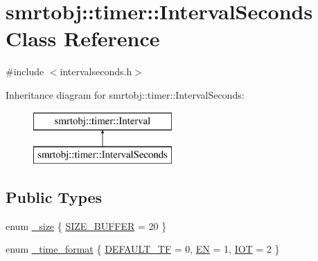\hypertarget{classsmrtobj_1_1timer_1_1_interval_seconds}{}\section{smrtobj\+:\+:timer\+:\+:Interval\+Seconds Class Reference}
\label{classsmrtobj_1_1timer_1_1_interval_seconds}


{\ttfamily \#include $<$intervalseconds.\+h$>$}

Inheritance diagram for smrtobj\+:\+:timer\+:\+:Interval\+Seconds\+:\begin{figure}[H]
\begin{center}
\leavevmode
\includegraphics[height=2.000000cm]{classsmrtobj_1_1timer_1_1_interval_seconds}
\end{center}
\end{figure}
\subsection*{Public Types}
\begin{DoxyCompactItemize}
\item 
enum \hyperlink{classsmrtobj_1_1timer_1_1_interval_seconds_ab2187a2f2aab3fb8d6fcebba3680f764}{\+\_\+size} \{ \hyperlink{classsmrtobj_1_1timer_1_1_interval_seconds_ab2187a2f2aab3fb8d6fcebba3680f764af1f97577d8278e2e1b54551fafd67e0d}{S\+I\+Z\+E\+\_\+\+B\+U\+F\+F\+E\+R} = 20
 \}
\item 
enum \hyperlink{classsmrtobj_1_1timer_1_1_interval_seconds_a6ea1edd04e074d9fbaacee7ce297c7f8}{\+\_\+time\+\_\+format} \{ \hyperlink{classsmrtobj_1_1timer_1_1_interval_seconds_a6ea1edd04e074d9fbaacee7ce297c7f8a5e6def1fd27d935d55908db5ce04e808}{D\+E\+F\+A\+U\+L\+T\+\_\+\+T\+F} = 0, 
\hyperlink{classsmrtobj_1_1timer_1_1_interval_seconds_a6ea1edd04e074d9fbaacee7ce297c7f8a0993e789564a57e0bab49c5dad63be94}{E\+N} = 1, 
\hyperlink{classsmrtobj_1_1timer_1_1_interval_seconds_a6ea1edd04e074d9fbaacee7ce297c7f8a88d4402a7caafbd1e4383f0e40ec4b4b}{I\+O\+T} = 2
 \}
\end{DoxyCompactItemize}
